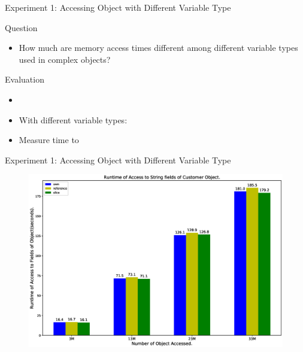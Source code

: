 \documentclass[9pt]{beamer}
\begin{document}

\begin{frame}[fragile]{Experiment 1: Accessing Object with Different Variable Type}
    
    Question
    \begin{itemize}
        \item How much are memory access times different among different variable types used in complex objects? 
    \end{itemize} 

    Evaluation
    \begin{itemize}
        \item {} 
        \item With different variable types: 
        \item Measure time to 
    \end{itemize}

\end{frame}


\begin{frame}[fragile]{Experiment 1: Accessing Object with Different Variable Type}

    \begin{figure}[hp]
        \centering
        \begin{center}
                \includegraphics[width=1\textwidth]{images/rust_access_different_poniter_init.eps}
                \captionsetup{labelformat=empty}
        \end{center}
    \end{figure}
\end{frame}
\end{document}
